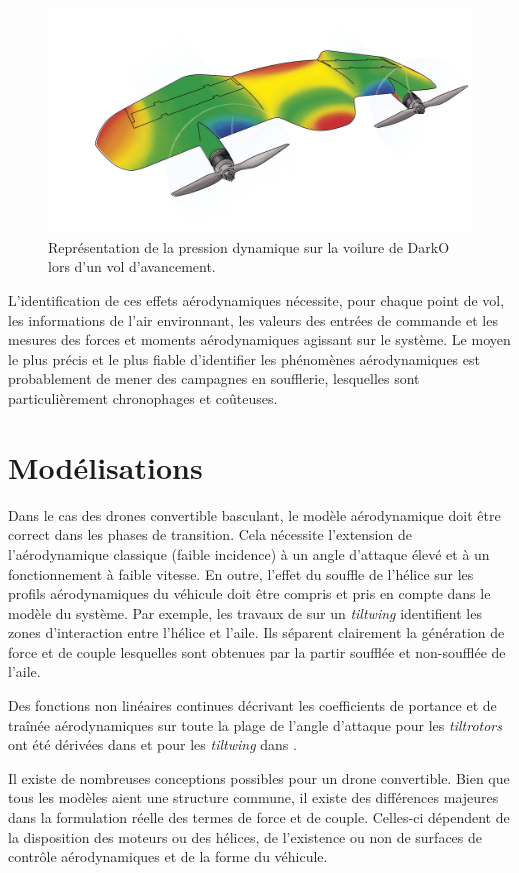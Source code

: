    \begin{figure}[ht!]
        \centering
            \includegraphics[width=0.6\columnwidth]{figures/Darko-air-pressure.png}
            \caption{Représentation de la pression dynamique sur la voilure de DarkO lors d'un vol d'avancement.}
            \label{fig:darkoAirPress}
    \end{figure}

     L'identification de ces effets aérodynamiques nécessite, pour chaque point de vol, les informations de l'air environnant, les valeurs des entrées de commande et les mesures des forces et moments aérodynamiques agissant sur le système. Le moyen le plus précis et le plus fiable d'identifier les phénomènes aérodynamiques est probablement de mener des campagnes en soufflerie, lesquelles sont particulièrement chronophages et coûteuses.


\section{Modélisations}
Dans le cas des drones convertible basculant, le modèle aérodynamique doit être correct dans les phases de transition. Cela nécessite l'extension de l'aérodynamique classique (faible incidence) à un angle d'attaque élevé et à un fonctionnement à faible vitesse. En outre, l'effet du souffle de l'hélice sur les profils aérodynamiques du véhicule doit être compris et pris en compte dans le modèle du système. Par exemple, les travaux de \cite{9444145} sur un \textit{tiltwing} identifient les zones d'interaction entre l'hélice et l'aile. Ils séparent clairement la génération de force et de couple lesquelles sont obtenues par la partir soufflée et non-soufflée de l'aile.

Des fonctions non linéaires continues décrivant les coefficients de portance et de traînée aérodynamiques sur toute la plage de l'angle d'attaque pour les  \textit{tiltrotors} ont été dérivées dans \cite{6981467} et pour les \textit{tiltwing} dans \cite{lustosaHal-03035938,Lustosa2017LaP}.

Il existe de nombreuses conceptions possibles pour un drone convertible. Bien que tous les modèles aient une structure commune, il existe des différences majeures dans la formulation réelle des termes de force et de couple. Celles-ci dépendent de la disposition des moteurs ou des hélices, de l'existence ou non de surfaces de contrôle aérodynamiques et de la forme du véhicule.

